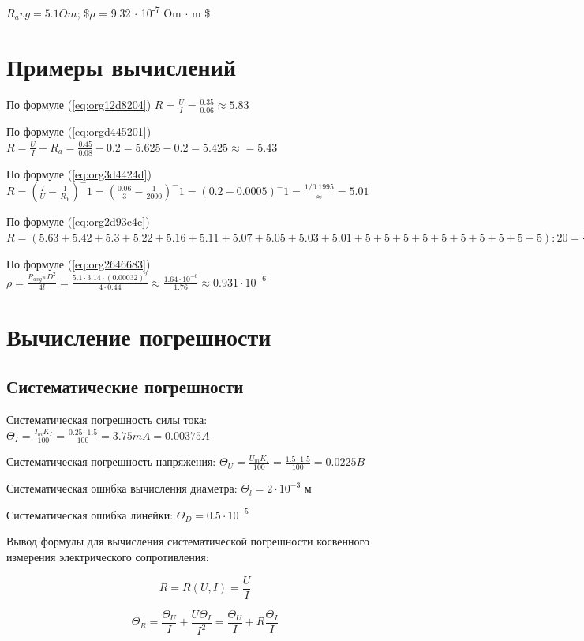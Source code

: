 \documentclass[14pt]{extarticle}
\begin{document}
\(R_avg = 5.1 Om\); \$\(\rho\) = 9.32 \(\cdot\) 10\textsuperscript{-7} Om \(\cdot\) m \$
\section{Примеры вычислений}
\label{sec:org02a4b21}

По формуле (\ref{eq:org12d8204}) \(R = \frac{U}{I} = \frac{0.35}{0.06} \approx 5.83\)

По формуле (\ref{eq:orgd445201}) \(R = \frac{U}{I} - R_a = \frac{0.45}{0.08} - 0.2 = 5.625 - 0.2 = 5.425 \approx = 5.43\)

По формуле (\ref{eq:org3d4424d}) \(R = (\frac{I}{U} - \frac{1}{R_V})^-1 = (\frac{0.06}{3} - \frac{1}{2000})^-1  = (0.2 - 0.0005)^-1 = \frac{1/0.1995} \approx = 5.01\)

По формуле (\ref{eq:org2d93c4c}) \(R = (5.63+5.42+5.3+5.22+5.16+5.11+5.07+5.05+5.03+5.01+5+5+5+5+5+5+5+5+5+5) : 20 = \frac{102}{20} = 5.1\)

По формуле (\ref{eq:org2646683}) \(\rho = \frac{R_{avg} \pi D^2}{4l} = \frac{5.1 \cdot 3.14 \cdot (0.00032)^2}{4 \cdot 0.44} \approx \frac{1.64 \cdot 10^{-6}}{1.76} \approx 0.931 \cdot 10^{-6}\)
\section{Вычисление погрешности}
\label{sec:org410b282}

\subsection{Систематические погрешности}
\label{sec:orgabc2a2e}

Систематическая погрешность силы тока: \(\Theta_I = \frac{I_m K_I}{100} = \frac{0.25 \cdot 1.5}{100} = 3.75 mA = 0.00375 A\)

Систематическая погрешность напряжения: \(\Theta_U = \frac{U_m K_I}{100} = \frac{1.5 \cdot 1.5}{100} = 0.0225 B\)

Систематическая ошибка вычисления диаметра: \(\Theta_l = 2 \cdot 10^{-3}\) м

Систематическая ошибка линейки: \(\Theta_D = 0.5 \cdot 10^{-5}\) 

Вывод формулы для вычисления систематической погрешности косвенного измерения электрического
сопротивления:


$$ R = R(U, I) = \frac{U}{I} $$

$$ \Theta_R = \frac{\Theta_U}{I} + \frac{U \Theta_I}{I^2} = \frac{\Theta_U}{I} + R \frac{\Theta_I}{I} $$
\end{document}
